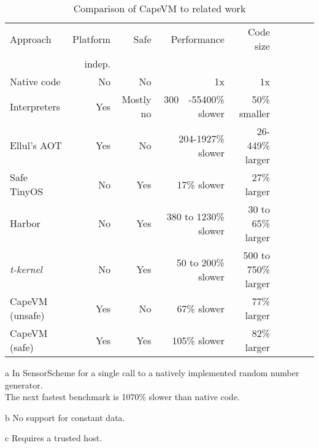 \begin{table}
\caption{Comparison of CapeVM to related work}
\label{tbl-contribution-comparison}
    \begin{threeparttable}
    \begin{tabular}{lrrrrrrrr} %
    \toprule
    Approach          & Platform    & Safe               & Performance           & Code size                  \\
                      & indep.      &                    &                       &                            \\
    \midrule
    \midrule
    Native code       & No          & No                 & 1x                    & 1x                         \\
    Interpreters      & Yes         & Mostly no          & 300\tnote{a}~~-55400\% slower    & ~50\% smaller \tnote{b}    \\ 
    Ellul's AOT       & Yes         & No                 & 204-1927\% slower     & 26-449\% larger \tnote{b}  \\
    Safe TinyOS       & No          & Yes \tnote{c}      & 17\% slower           & 27\% larger                \\
    Harbor            & No          & Yes                & 380 to 1230\% slower  & 30 to 65\% larger          \\
    \emph{t-kernel}   & No          & Yes                & 50 to 200\% slower    & 500 to 750\% larger        \\
    CapeVM (unsafe)   & Yes         & No                 & 67\% slower           & 77\% larger                \\ %
    CapeVM (safe)     & Yes         & Yes                & 105\% slower          & 82\% larger                \\ %
    \bottomrule
    \end{tabular}
    \begin{tablenotes}
        \item[a] In SensorScheme for a single call to a natively implemented random number generator. \\ The next fastest benchmark is 1070\% slower than native code.
        \item[b] No support for constant data.
        \item[c] Requires a trusted host.
    \end{tablenotes}
    \end{threeparttable}
\end{table}
